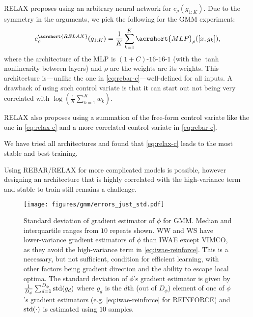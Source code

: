 \Acrshort{RELAX} proposes using an arbitrary neural network for $c_\rho(g_{1:K})$.
Due to the symmetry in the arguments, we pick the following for the \gls{GMM} experiment:
\begin{align}
    c_\rho^{\acrshort{RELAX}}(g_{1:K}) = \frac{1}{K} \sum_{k = 1}^K \acrshort{MLP}_\rho([x, g_k]), \label{eq:relax-c}
\end{align}
where the architecture of the \gls{MLP} is $(1 + C)$-$16$-$16$-$1$ (with the $\tanh$ nonlinearity between layers) and $\rho$ are the weights are its weights.
This architecture is---unlike the one in \cref{eq:rebar-c}---well-defined for all inputs.
A drawback of using such control variate is that it can start out not being very correlated with $\log(\frac{1}{K} \sum_{k = 1}^K w_k)$.

\Acrshort{RELAX} also proposes using a summation of the free-form control variate like the one in \cref{eq:relax-c} and a more correlated control variate in \cref{eq:rebar-c}.

We have tried all architectures and found that \cref{eq:relax-c} leads to the most stable and best training.

Using \acrshort{REBAR}/\acrshort{RELAX} for more complicated models is possible, however designing an architecture that is highly correlated with the high-variance term and stable to train still remains a challenge.

\begin{figure*}[!htb]
  \centering
  \texttt{[image: figures/gmm/errors\_just\_std.pdf]}
  \vspace*{-4ex}
  \caption{
    Standard deviation of gradient estimator of $\phi$ for \gls{GMM}.
    Median and interquartile ranges from $10$ repeats shown.
    \Gls{WW} and \gls{WS} have lower-variance gradient estimators of $\phi$ than \gls{IWAE} except \gls{VIMCO}, as they avoid the high-variance term  in \eqref{eq:iwae-reinforce}.
    This is a necessary, but not sufficient, condition for efficient learning, with other factors being gradient direction and the ability to escape local optima.
    The standard deviation of $\phi$'s gradient estimator is given by $\frac{1}{D_\phi} \sum_{d = 1}^{D_\phi} \operatorname{\mathrm{std}}(g_d)$ where $g_d$ is the $d$th (out of $D_\phi$) element of one of $\phi$'s gradient estimators (e.g. \cref{eq:iwae-reinforce} for \acrshort{REINFORCE}) and $\operatorname{\mathrm{std}}(\cdot)$ is estimated using $10$ samples.
  }
  \label{fig:gmm_just_std}
  \vspace*{-2ex}
\end{figure*}

